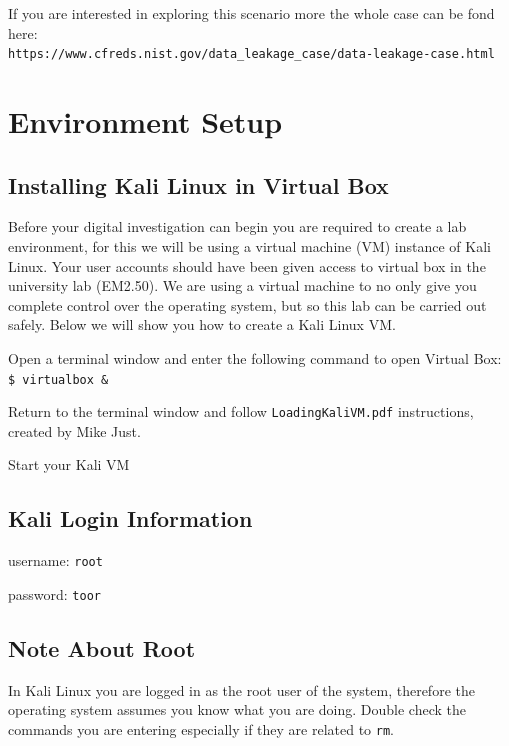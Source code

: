 \documentclass[a4paper,11pt]{article}
\begin{document}
 If you are interested in exploring this scenario more the whole case can be fond here:\\
 \verb|https://www.cfreds.nist.gov/data_leakage_case/data-leakage-case.html|

\section{Environment Setup}
\subsection*{Installing Kali Linux in Virtual Box}
Before your digital investigation can begin you are required to create a lab environment, for this we will be using a virtual machine (VM) instance of Kali Linux.
Your user accounts should have been given access to virtual box in the university lab (EM2.50). We are using a virtual machine to no only give you complete control over the operating system, but so this lab can be carried out safely. Below we will show you how to create a Kali Linux VM.
	\begin{enumerate*}
	 \item Open a terminal window and enter the following command to open Virtual Box:\\
		\texttt{{\$}	virtualbox {\&}}
	\item Return to the terminal window and follow \texttt{LoadingKaliVM.pdf} instructions, created by Mike Just.
	\item Start your Kali VM
	\end{enumerate*}
	
\subsection{Kali Login Information}
\begin{itemize*}
	\item username: \texttt{root}
	\item password: \texttt{toor}
\end{itemize*}

\subsection{Note About Root}
In Kali Linux you are logged in as the root user of the system, therefore the operating system assumes you know what you are doing. Double check the commands you are entering especially if they are related to \texttt{rm}.
\end{document}

